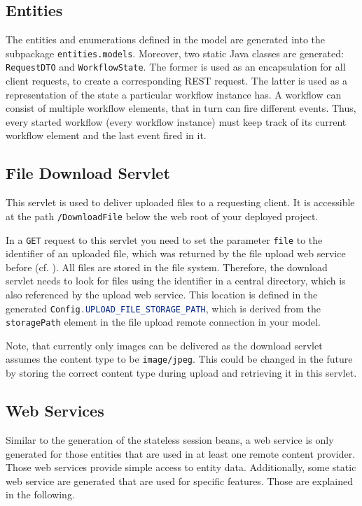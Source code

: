 \subsection{Entities}
The entities and enumerations defined in the \MD model are generated into the subpackage \lstinline|entities.models|. Moreover, two static Java classes are generated:  \lstinline|RequestDTO| and \lstinline|WorkflowState|. The former is used as an encapsulation for all client requests, \eg to create a corresponding REST request. The latter is used as a representation of the state a particular workflow instance has. A workflow can consist of multiple workflow elements, that in turn can fire different events. Thus, every started workflow (\ie every workflow instance) must keep track of its current workflow element and the last event fired in it.

\subsection{File Download Servlet}
This servlet is used to deliver uploaded files to a requesting client. It is accessible at the path \lstinline|/DownloadFile| below the web root of your deployed project. 

In a \lstinline[language=Simple]|GET| request to this servlet you need to set the parameter \lstinline|file| to the identifier of an uploaded file, which was returned by the file upload web service before (cf. ). 
All files are stored in the file system. Therefore, the download servlet needs to look for files using the identifier in a central directory, which is also referenced by the upload web service. This location  is defined in the generated \lstinline[language=Java]|Config.UPLOAD_FILE_STORAGE_PATH|, which is derived from the \lstinline|storagePath| element in the file upload remote connection in your model.

Note, that currently only images can be delivered as the download servlet assumes the content type to be \lstinline|image/jpeg|. This could be changed in the future by storing the correct content type during upload and retrieving it in this servlet.

\subsection{Web Services}
Similar to the generation of the stateless session beans, a web service is only generated for those entities that are used in at least one remote content provider. Those web services provide simple access to entity data.
Additionally, some static web service are generated that are used for specific features. Those are explained in the following.

